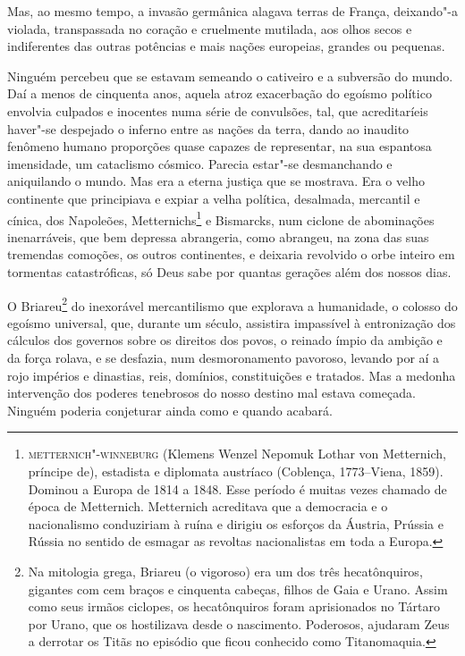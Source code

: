 Mas, ao mesmo tempo, a invasão germânica alagava terras de França,
deixando"-a violada, transpassada no coração e cruelmente mutilada, aos
olhos secos e indiferentes das outras potências e mais nações
europeias, grandes ou pequenas.

Ninguém percebeu que se estavam semeando o cativeiro e a subversão
do mundo. Daí a menos de cinquenta anos, aquela atroz exacerbação do
egoísmo político envolvia culpados e inocentes numa série de
convulsões, tal, que acreditaríeis haver"-se despejado o inferno entre
as nações da terra, dando ao inaudito fenômeno humano proporções quase
capazes de representar, na sua espantosa imensidade, um cataclismo
cósmico. Parecia estar"-se desmanchando e aniquilando o mundo. Mas era a
eterna justiça que se mostrava. Era o velho continente que principiava
e expiar a velha política, desalmada, mercantil e cínica, dos
Napoleões, Metternichs\footnote{ \textsc{metternich"-winneburg} (Klemens Wenzel Nepomuk
Lothar von Metternich, príncipe de), estadista e diplomata
austríaco (Coblença, 1773--Viena, 1859). Dominou a Europa de 1814 a
1848. Esse período é muitas vezes chamado de época de
Metternich. Metternich acreditava que a democracia e o nacionalismo
conduziriam à ruína e dirigiu os esforços da Áustria, Prússia e Rússia
no sentido de esmagar as revoltas nacionalistas em toda a Europa.} 
e Bismarcks, num ciclone de abominações 
inenarráveis, que bem depressa abrangeria, como
abrangeu, na zona das suas tremendas comoções, os outros continentes, e
deixaria revolvido o orbe inteiro em tormentas catastróficas, só Deus
sabe por quantas gerações além dos nossos dias.

O Briareu\footnote{ Na mitologia grega, Briareu (o vigoroso) era
um dos três hecatônquiros, gigantes com cem
braços e cinquenta cabeças, filhos de Gaia e
Urano. Assim como seus irmãos
ciclopes, os hecatônquiros foram aprisionados
no Tártaro por Urano, que os hostilizava desde
o nascimento. Poderosos, ajudaram Zeus a
derrotar os Titãs no episódio que ficou
conhecido como Titanomaquia.} do
inexorável mercantilismo que explorava a humanidade, o colosso do
egoísmo universal, que, durante um século, assistira impassível à
entronização dos cálculos dos governos sobre os direitos dos povos, o
reinado ímpio da ambição e da força rolava, e se desfazia, num
desmoronamento pavoroso, levando por aí a rojo impérios e dinastias,
reis, domínios, constituições e tratados. Mas a medonha intervenção dos
poderes tenebrosos do nosso destino mal estava começada. Ninguém
poderia conjeturar ainda como e quando acabará.

